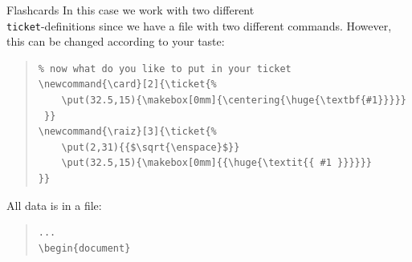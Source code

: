 \documentclass[aspectratio=1610,hyperref={pdfpagelabels=false}]{beamer}
\def\code#1{\texttt{#1}}
\newcommand{\ticket}{{\code{ticket.sty}}}
\newcommand{\bs}{{\mtt\\}}
\begin{document}
\begin{frame}[fragile]\vspace*{-4mm}
\begin{block}{Flashcards}
In this case we work with two different \code{\bs{}ticket}-definitions since we have a file
with two different commands. However, this can be changed according to your taste:
\end{block}
\begin{quote}
    \begin{minipage}[t]{0.5\textwidth}
      {\scriptsize
\begin{verbatim}
% now what do you like to put in your ticket
\newcommand{\card}[2]{\ticket{%
    \put(32.5,15){\makebox[0mm]{\centering{\huge{\textbf{#1}}}}}
 }}
\newcommand{\raiz}[3]{\ticket{%
    \put(2,31){{$\sqrt{\enspace}$}}
    \put(32.5,15){\makebox[0mm]{{\huge{\textit{{ #1 }}}}}}
}}
\end{verbatim}
        }
    \end{minipage}
\end{quote}

All data is in a file:
\begin{quote}
    \begin{minipage}[t]{0.5\textwidth}
      {\scriptsize
\begin{verbatim}
...
\begin{document}

\end{verbatim}
        }
    \end{minipage}
\end{quote}
\end{frame}
\end{document}
